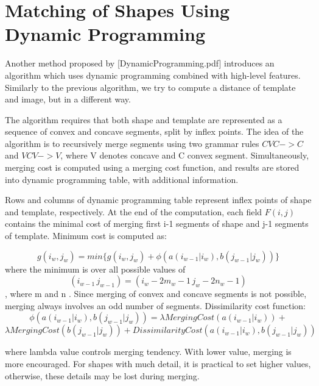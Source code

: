 \section{Matching of Shapes Using Dynamic Programming}
Another method proposed by [DynamicProgramming.pdf] introduces an algorithm  which uses dynamic programming combined with high-level features. Similarly to the previous algorithm, we try to compute a distance of template and image, but in a different way.

The algorithm requires that both shape and template are represented as a sequence of convex and concave segments, split by inflex points. The idea of the algorithm is to recursively merge segments using two grammar rules $CVC -> C$ and $VCV -> V$, where V denotes concave and C convex segment. Simultaneously, merging cost is computed using a merging cost function, and results are stored into dynamic programming table, with additional information.

Rows and columns of dynamic programming table represent inflex points of shape and template, respectively. At the end of the computation, each field $F(i,j)$ contains the minimal cost of merging first i-1 segments of shape and j-1 segments of template. Minimum cost is computed as:

\begin{equation*}
g(i_{w},j_{w}) = min\{g(i_{w},j_{w}) + \phi(a(i_{w-1}|i_{w}), b(j_{w-1}|j_{w}))\}
\end{equation*}
where the minimum is over all possible values of 
\begin{equation*}
(i_{w-1}\,j_{w-1})  =  (i_{w} - 2m_{w} -1\, j_{w} - 2n_{w} - 1)
\end{equation*}
, where m  and n .
Since merging of convex and concave segments is not possible, merging always involves an odd number of segments. Dissimilarity cost function: 
\begin{equation*}
\phi(a(i_{w-1}|i_{w}), b(j_{w-1}|j_{w}))  =  \lambda MergingCost(a(i_{w-1}|i_{w}))  +
\end{equation*}
\begin{equation*} 
\lambda MergingCost(b(j_{w-1}|j_{w}))  +  DissimilarityCost(a(i_{w-1}|i_{w}), b(j_{w-1}|j_{w}))
\end{equation*}

where lambda value controls merging tendency. With lower value, merging is more encouraged. For shapes with much detail, it is practical to set higher values, otherwise, these details may be lost during merging. 

